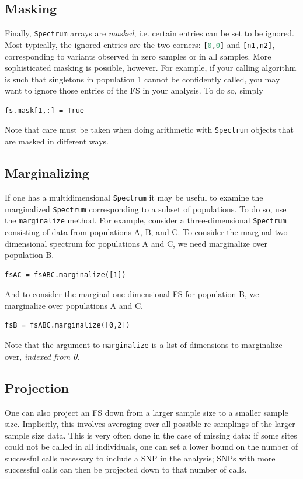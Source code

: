 \documentclass[12pt]{article}
\makeatletter
\newcommand{\py}[1]{\lstinline[breaklines=true,language=Python, showstringspaces=False]@#1@}
\makeatother
\begin{document}
\subsection{Masking}

Finally, \py{Spectrum} arrays are \emph{masked}, i.e. certain entries can be set to be ignored.
Most typically, the ignored entries are the two corners: \py{[0,0]} and \py{[n1,n2]}, corresponding to variants observed in zero samples or in all samples.
More sophisticated masking is possible, however.
For example, if your calling algorithm is such that singletons in population 1 cannot be confidently called, you may want to ignore those entries of the FS in your analysis.
To do so, simply
\begin{lstlisting}
fs.mask[1,:] = True
\end{lstlisting}
Note that care must be taken when doing arithmetic with \py{Spectrum} objects that are masked in different ways.

\subsection{Marginalizing}

If one has a multidimensional \py{Spectrum} it may be useful to examine the marginalized \py{Spectrum} corresponding to a subset of populations.
To do so, use the \py{marginalize} method.
For example, consider a three-dimensional \py{Spectrum} consisting of data from populations A, B, and C.
To consider the marginal two dimensional spectrum for populations A and C, we need marginalize over population B.
\begin{lstlisting}
fsAC = fsABC.marginalize([1])
\end{lstlisting}
And to consider the marginal one-dimensional FS for population B, we marginalize over populations A and C.
\begin{lstlisting}
fsB = fsABC.marginalize([0,2])
\end{lstlisting}
Note that the argument to \py{marginalize} is a list of dimensions to marginalize over, \emph{indexed from 0}.

\subsection{Projection}

One can also project an FS down from a larger sample size to a smaller sample size.
Implicitly, this involves averaging over all possible re-samplings of the larger sample size data.
This is very often done in the case of missing data: if some sites could not be called in all individuals, one can set a lower bound on the number of successful calls necessary to include a SNP in the analysis; SNPs with more successful calls can then be projected down to that number of calls.
\end{document}
